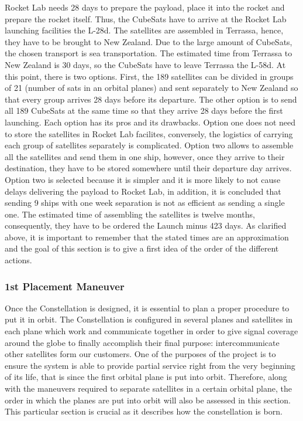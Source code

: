 Rocket Lab needs 28 days to prepare the payload, place it into the rocket and prepare the rocket itself. Thus, the CubeSats have to arrive at the Rocket Lab launching facilities the L-28d. The satellites are assembled in Terrassa, hence, they have to be brought to New Zealand. Due to the large amount of CubeSats, the chosen transport is sea transportation. The estimated time from Terrassa to New Zealand is 30 days, so the CubeSats have to leave Terrassa the L-58d. At this point, there is two options. First, the 189 satellites can be divided in groups of 21 (number of sats in an orbital planes) and sent separately to New Zealand so that every group arrives 28 days before its departure. The other option is to send all 189 CubeSats at the same time so that they arrive 28 days before the first launching. Each option has its pros and its drawbacks. Option one does not need to store the satellites in Rocket Lab facilites, conversely, the logistics of carrying each group of satellites separately is complicated. Option two allows to assemble all the satellites and send them in one ship, however, once they arrive to their destination, they have to be stored somewhere until their departure day arrives. Option two is selected because it is simpler and it is more likely to not cause delays delivering the payload to Rocket Lab, in addition, it is concluded that sending 9 ships with one week separation is not as efficient as sending a single one. 
\newline\newline
The estimated time of assembling the satellites is twelve months, consequently, they have to be ordered the Launch minus 423 days. 
\newline\newline
As clarified above, it is important to remember that the stated times are an approximation and the goal of this section is to give a first idea of the order of the different actions. 
\subsubsection{1st Placement Maneuver}
Once the Constellation is designed, it is essential to plan a proper procedure to put it in orbit. The Constellation is configured in several planes and satellites in each plane which work and communicate together in order to give signal coverage around the globe to finally accomplish their final purpose: intercommunicate other satellites form our customers.
\newline\newline
One of the purposes of the project is to ensure the system is able to provide partial service right from the very beginning of its life, that is since the first orbital plane is put into orbit. Therefore, along with the maneuvers required to separate satellites in a certain orbital plane, the order in which the planes are put into orbit will also be assessed in this section. This particular section is crucial as it describes how the constellation is born.

